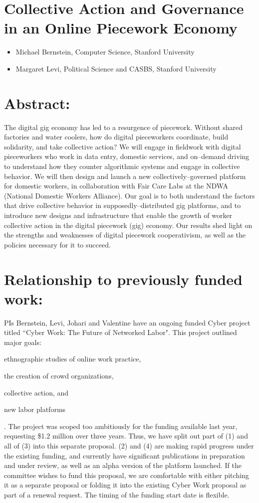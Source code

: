 \documentclass[11pt]{article}
\begin{document}
\section*{Collective Action and Governance in an Online Piecework Economy}

\begin{itemize}[leftmargin=0em,label={}]
  \item Michael Bernstein, Computer Science, Stanford University
  \item Margaret Levi, Political Science and CASBS, Stanford University
\end{itemize}

\section*{Abstract:} 
The digital gig economy has led to a resurgence of piecework.
Without shared factories and water coolers,
how do digital pieceworkers coordinate,
build solidarity,
and take collective action?
We will engage in fieldwork with digital pieceworkers who work in data entry,
domestic services,
and on--demand driving to understand how they counter algorithmic systems and engage in collective behavior.
We will then design and launch a new collectively--governed platform for domestic workers,
in collaboration with Fair Care Labs at the NDWA
(National Domestic Workers Alliance).
Our goal is to both understand the factors that drive collective behavior in supposedly--distributed gig platforms,
and to introduce new designs and infrastructure that enable the growth of worker collective action in the digital piecework
(gig)
economy.
Our results shed light on the strengths and weaknesses of  digital piecework cooperativism,
as well as the policies necessary for it to succeed.

\section*{Relationship to previously funded work:}
PIs Bernstein,
Levi,
Johari and Valentine have an ongoing funded Cyber project titled ``Cyber Work: The Future of Networked Labor".
This project outlined major goals:
\begin{inlinelist}
\item ethnographic studies of online work practice,
\item the creation of crowd organizations,
\item collective action,
and
\item new labor platforms
\end{inlinelist}.
The project was scoped too ambitiously for the funding available last year,
requesting \$1.2 million over three years.
Thus, we have split out part of
(1) and all of
(3) into this separate proposal.
(2) and (4) are making rapid progress under the existing funding,
and currently have significant publications in preparation and under review,
as well as an alpha version of the platform launched.
If the committee wishes to fund this proposal,
we are comfortable with either pitching it as a separate proposal or folding it into the existing Cyber Work proposal as part of a renewal request.
The timing of the funding start date is flexible.
\end{document}
